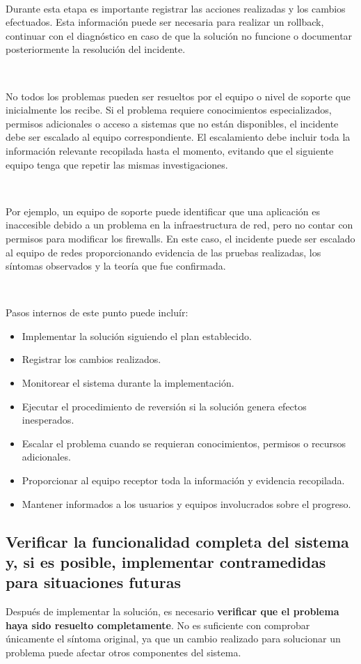 \documentclass[a4paper,10pt]{article}
\begin{document}
\

Durante esta etapa es importante registrar las acciones realizadas y los cambios efectuados. 
Esta información puede ser necesaria para realizar un rollback, continuar con el diagnóstico en caso de que la solución no funcione o documentar posteriormente la resolución del incidente.

\

No todos los problemas pueden ser resueltos por el equipo o nivel de soporte que inicialmente los recibe. 
Si el problema requiere conocimientos especializados, permisos adicionales o acceso a sistemas que no están disponibles, el incidente debe ser escalado al equipo correspondiente. 
El escalamiento debe incluir toda la información relevante recopilada hasta el momento, evitando que el siguiente equipo tenga que repetir las mismas investigaciones.

\

Por ejemplo, un equipo de soporte puede identificar que una aplicación es inaccesible debido a un problema en la infraestructura de red, 
pero no contar con permisos para modificar los firewalls. En este caso, el incidente puede ser escalado al equipo de redes proporcionando evidencia de las pruebas realizadas, los síntomas observados y 
la teoría que fue confirmada.

\

Pasos internos de este punto puede incluír:

\begin{itemize}
    \item Implementar la solución siguiendo el plan establecido.
    \item Registrar los cambios realizados.
    \item Monitorear el sistema durante la implementación.
    \item Ejecutar el procedimiento de reversión si la solución genera efectos inesperados.
    \item Escalar el problema cuando se requieran conocimientos, permisos o recursos adicionales.
    \item Proporcionar al equipo receptor toda la información y evidencia recopilada.
    \item Mantener informados a los usuarios y equipos involucrados sobre el progreso.
\end{itemize}

\subsection{Verificar la funcionalidad completa del sistema y, si es posible, implementar contramedidas para situaciones futuras}
Después de implementar la solución, es necesario \textbf{verificar que el problema haya sido resuelto completamente}. No es suficiente con comprobar únicamente el síntoma original, ya que un cambio realizado 
para solucionar un problema puede afectar otros componentes del sistema.
\end{document}
